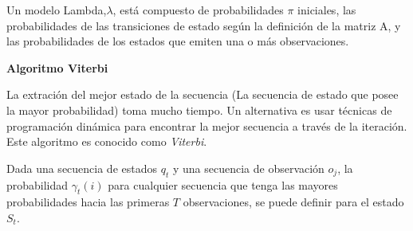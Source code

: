 Un modelo Lambda,$\lambda$, está compuesto de probabilidades $\pi$ iniciales, las probabilidades de las transiciones de estado según la definición de la matriz A, y las probabilidades de los estados que emiten una o más observaciones.
















\vspace{1cm}


\textbf{Algoritmo Viterbi}

La extración del mejor estado de la secuencia (La secuencia de estado que posee la mayor probabilidad) toma mucho tiempo. Un alternativa es usar técnicas de programación dinámica para encontrar la mejor secuencia %
a través de la iteración. Este algoritmo es conocido como \emph{Viterbi}. 

Dada una secuencia de estados $q_{t}$ y una secuencia de observación  $o_{j}$, la probabilidad $\gamma_{t}(i)$ 
para cualquier secuencia que tenga las mayores probabilidades hacia  las primeras $T$ observaciones, se puede definir para el estado $S_{t}$.

